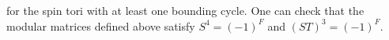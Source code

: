 for the spin tori with at least one bounding cycle.
One can check that the modular matrices defined above satisfy $S^4 = (-1)^F$ and $(ST)^3 = (-1)^F$. 









